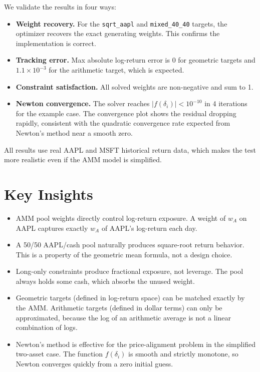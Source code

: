 \documentclass[12pt]{article}
\begin{document}
We validate the results in four ways:

\begin{itemize}
    \item \textbf{Weight recovery.} For the \texttt{sqrt\_aapl} and \texttt{mixed\_40\_40} targets, the optimizer recovers the exact generating weights. This confirms the implementation is correct.
    \item \textbf{Tracking error.} Max absolute log-return error is 0 for geometric targets and $1.1 \times 10^{-3}$ for the arithmetic target, which is expected.
    \item \textbf{Constraint satisfaction.} All solved weights are non-negative and sum to 1.
    \item \textbf{Newton convergence.} The solver reaches $|f(\delta_i)| < 10^{-10}$ in 4 iterations for the example case. The convergence plot shows the residual dropping rapidly, consistent with the quadratic convergence rate expected from Newton's method near a smooth zero.
\end{itemize}

All results use real AAPL and MSFT historical return data, which makes the test more realistic even if the AMM model is simplified.

\section{Key Insights}

\begin{itemize}
    \item AMM pool weights directly control log-return exposure. A weight of $w_A$ on AAPL captures exactly $w_A$ of AAPL's log-return each day.
    \item A 50/50 AAPL/cash pool naturally produces square-root return behavior. This is a property of the geometric mean formula, not a design choice.
    \item Long-only constraints produce fractional exposure, not leverage. The pool always holds some cash, which absorbs the unused weight.
    \item Geometric targets (defined in log-return space) can be matched exactly by the AMM. Arithmetic targets (defined in dollar terms) can only be approximated, because the log of an arithmetic average is not a linear combination of logs.
    \item Newton's method is effective for the price-alignment problem in the simplified two-asset case. The function $f(\delta_i)$ is smooth and strictly monotone, so Newton converges quickly from a zero initial guess.
\end{itemize}
\end{document}

